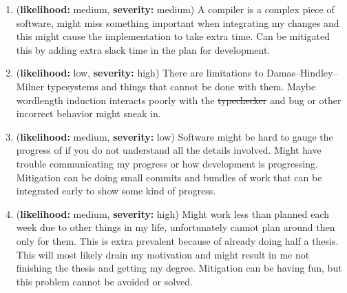 \documentclass[msc,lith,english]{liuthesis}
\providecommand{\DIFadd}[1]{{\protect\color{blue}\uwave{#1}}} %
\providecommand{\DIFdel}[1]{{\protect\color{red}\sout{#1}}}                      %
\providecommand{\DIFaddbegin}{} %
\providecommand{\DIFaddend}{} %
\providecommand{\DIFdelbegin}{} %
\providecommand{\DIFdelend}{} %
\begin{document}
\newcommand{\riskHeader}[2]{(\textbf{likelihood:} #1, \textbf{severity:} #2)}
\begin{enumerate}
  \item \riskHeader{medium}{medium} A compiler is a complex piece of software, might miss something important when integrating my changes and this might cause the implementation to take extra time. Can be mitigated this by adding extra slack time in the plan for development.

  \item \riskHeader{low}{high} There are limitations to Damas–Hindley–Milner typesystems and things that cannot be done with them. Maybe wordlength induction interacts poorly with the \DIFdelbegin \DIFdel{typechecker }\DIFdelend \DIFaddbegin \DIFadd{type checker }\DIFaddend and bug or other incorrect behavior might sneak in.

  \item \riskHeader{medium}{low} Software might be hard to gauge the progress of if you do not understand all the details involved. Might have trouble communicating my progress or how development is progressing. Mitigation can be doing small commits and bundles of work that can be integrated early to show some kind of progress.

  \item \riskHeader{medium}{high} Might work less than planned each week due to other things in my life, unfortunately cannot plan around then only for them. This is extra prevalent because of already doing half a thesis. This will most likely drain my motivation and might result in me not finishing the thesis and getting my degree. Mitigation can be having fun, but this problem cannot be avoided or solved.

\end{enumerate}
\DIFdelbegin %

\DIFdelend 

\todos
\end{document}
